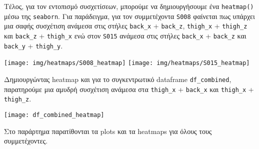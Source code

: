         Τέλος, για τον εντοπισμό συσχετίσεων, μπορούμε να δημιουργήσουμε ένα \texttt{heatmap()} μέσω της \texttt{seaborn}.
        Για παράδειγμα, για τον συμμετέχοντα \texttt{S008} φαίνεται πως υπάρχει μια σαφής συσχέτιση ανάμεσα στις στήλες \verb|back_x| + \verb|back_z|,
        \verb|thigh_x| + \verb|thigh_z| και \verb|back_z| + \verb|thigh_x| ενώ στον \texttt{S015} ανάμεσα στις στήλες \verb|back_x| + \verb|back_z| και \verb|back_y| + \verb|thigh_y|.

        \begin{multicols}{2} \centering
            \noindent\texttt{[image: img/heatmaps/S008\_heatmap]}
            \texttt{[image: img/heatmaps/S015\_heatmap]}
        \end{multicols}

        Δημιουργώντας heatmap και για το συγκεντρωτικό dataframe \verb|df_combined|, παρατηρούμε μια  αμυδρή συσχέτιση
        ανάμεσα στα \verb|thigh_x| + \verb|back_x| και \verb|thigh_x| + \verb|thigh_z|.

        \vspace{-5pt}
        \begin{center}
            \texttt{[image: df\_combined\_heatmap]}
        \end{center}

        \begin{graycomment} \centering
            Στο παράρτημα παρατίθονται τα plots και τα heatmaps για όλους τους συμμετέχοντες.
        \end{graycomment}
\pagebreak